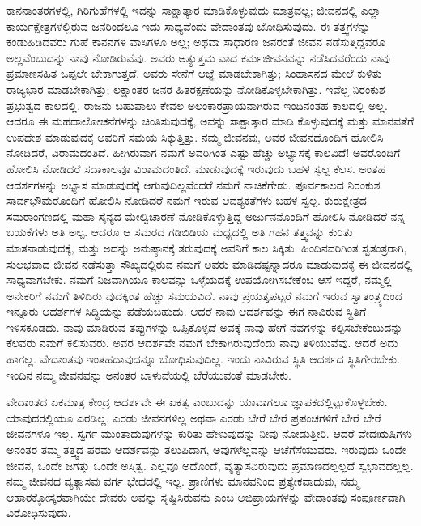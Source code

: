 ಕಾನನಾಂತರಗಳಲ್ಲಿ, ಗಿರಿಗುಹೆಗಳಲ್ಲಿ ಇದನ್ನು ಸಾಕ್ಷಾತ್ಕಾರ ಮಾಡಿಕೊಳ್ಳುವುದು ಮಾತ್ರವಲ್ಲ; ಜೀವನದಲ್ಲಿ ಎಲ್ಲಾ ಕಾರ್ಯಕ್ಷೇತ್ರಗಳಲ್ಲಿರುವ ಜನರಿಂದಲೂ ಇದು ಸಾಧ್ಯವೆಂದು ವೇದಾಂತವು ಬೋಧಿಸುವುದು. ಈ ತತ್ತ್ವಗಳನ್ನು ಕಂಡುಹಿಡಿದವರು ಗುಹೆ ಕಾನನಗಳ ವಾಸಿಗಳೂ ಅಲ್ಲ; ಅಥವಾ ಸಾಧಾರಣ ಜನರಂತೆ ಜೀವನ ನಡೆಸುತ್ತಿದ್ದವರೂ ಅಲ್ಲವೆಂಬುದನ್ನು ನಾವು ನೋಡಿರುವೆವು. ಅವರು ಅತ್ಯುತ್ತಮ ವಾದ ಕರ್ಮಜೀವನವನ್ನು ನಡೆಸಿದವರೆಂದು ನಾವು ಪ್ರಮಾಣಸಹಿತ ಒಪ್ಪಲೇ ಬೇಕಾಗುತ್ತದೆ. ಅವರು ಸೇನೆಗೆ ಆಜ್ಞೆ ಮಾಡಬೇಕಾಗಿತ್ತು; ಸಿಂಹಾಸನದ ಮೇಲೆ ಕುಳಿತು ರಾಜ್ಯಭಾರ ಮಾಡಬೇಕಾಗಿತ್ತು; ಲಕ್ಷಾಂತರ ಜನರ ಹಿತರಕ್ಷಣೆಯನ್ನು ನೋಡಿಕೊಳ್ಳಬೇಕಾಗಿತ್ತು. ಇವೆಲ್ಲ ನಿರಂಕುಶ ಪ್ರಭುತ್ವದ ಕಾಲದಲ್ಲಿ, ರಾಜನು ಬಹುಪಾಲು ಕೇವಲ ಅಲಂಕಾರಪ್ರಾಯನಾಗಿರುವ ಇಂದಿನಂತಹ ಕಾಲದಲ್ಲಿ ಅಲ್ಲ. ಆದರೂ ಈ ಮಹದಾಲೋಚನೆಗಳನ್ನು ಚಿಂತಿಸುವುದಕ್ಕೆ, ಅವನ್ನು ಸಾಕ್ಷಾತ್ಕಾರ ಮಾಡಿ ಕೊಳ್ಳುವುದಕ್ಕೆ ಮತ್ತು ಮಾನವತೆಗೆ ಉಪದೇಶ ಮಾಡುವುದಕ್ಕೆ ಅವರಿಗೆ ಸಮಯ ಸಿಕ್ಕುತ್ತಿತ್ತು. ನಮ್ಮ ಜೀವನವು, ಅವರ ಜೀವನದೊಂದಿಗೆ ಹೋಲಿಸಿ ನೋಡಿದರೆ, ವಿರಾಮದಂತಿದೆ. ಹೀಗಿರುವಾಗ ನಮಗೆ ಅವರಿಗಿಂತ ಎಷ್ಟು ಹೆಚ್ಚು ಅಭ್ಯಾಸಕ್ಕೆ ಕಾಲವಿದೆ! ಅವರೊಂದಿಗೆ ಹೋಲಿಸಿ ನೋಡಿದರೆ ಸದಾಕಾಲವೂ ವಿರಾಮದಂತಿದೆ. ಮಾಡುವುದಕ್ಕೆ ಇರುವುದು ಬಹಳ ಸ್ವಲ್ಪ ಕೆಲಸ. ಅಂತಹ ಆದರ್ಶಗಳನ್ನು ಅಭ್ಯಾಸ ಮಾಡುವುದಕ್ಕೆ ಆಗುವುದಿಲ್ಲವೆಂದರೆ ನಮಗೆ ನಾಚಿಕೆಗೇಡು. ಪೂರ್ವಕಾಲದ ನಿರಂಕುಶ ಸಾರ್ವಭೌಮರೊಂದಿಗೆ ಹೋಲಿಸಿ ನೋಡಿದರೆ ನಮಗೆ ಇರುವ ಆವಶ್ಯಕತೆಗಳು ಬಹಳ ಸ್ವಲ್ಪ. ಕುರುಕ್ಷೇತ್ರದ ಸಮರಾಂಗಣದಲ್ಲಿ ಮಹಾ ಸೈನ್ಯದ ಮೇಲ್ವಿಚಾರಣೆ ನೋಡಿಕೊಳ್ಳುತ್ತಿದ್ದ ಅರ್ಜುನನೊಂದಿಗೆ ಹೋಲಿಸಿ ನೋಡಿದರೆ ನನ್ನ ಬಯಕೆಗಳು ಅತಿ ಅಲ್ಪ. ಆದರೂ ಆ ಸಮರದ ಗಡಿಬಿಡಿಯ ಮಧ್ಯದಲ್ಲಿ ಅತಿ ಗಹನ ತತ್ತ್ವವನ್ನು ಕುರಿತು ಮಾತನಾಡುವುದಕ್ಕೆ, ಮತ್ತು ಅದನ್ನು ಅನುಷ್ಠಾನಕ್ಕೆ ತರುವುದಕ್ಕೆ ಅವನಿಗೆ ಕಾಲ ಸಿಕ್ಕಿತು. ಹಿಂದಿನವರಿಗಿಂತ ಸ್ವತಂತ್ರರಾಗಿ, ಸುಲಭವಾದ ಜೀವನ ನಡೆಸುತ್ತಾ ಸೌಖ್ಯದಲ್ಲಿರುವ ನಮಗೆ ಅವರು ಮಾಡಿದಷ್ಟನ್ನಾದರೂ ಮಾಡುವುದಕ್ಕೆ ಈ ಜೀವನದಲ್ಲಿ ಸಾಧ್ಯವಾಗಬೇಕು. ನಮಗೆ ನಿಜವಾಗಿಯೂ ಕಾಲವನ್ನು ಒಳ್ಳೆಯದಕ್ಕೆ ಉಪಯೋಗಿಸಬೇಕೆಂಬ ಆಸೆ ಇದ್ದರೆ, ನಮ್ಮಲ್ಲಿ ಅನೇಕರಿಗೆ ನಮಗೆ ತಿಳಿದಿರು ವುದಕ್ಕಿಂತ ಹೆಚ್ಚು ಸಮಯವಿದೆ. ನಾವು ಪ್ರಯತ್ನಪಟ್ಟರೆ ನಮಗೆ ಇರುವ ಸ್ವಾತಂತ್ರ್ಯದಿಂದ ಇನ್ನೂರು ಆದರ್ಶಗಳ ಸಿದ್ಧಿಯನ್ನು ಪಡೆಯಬಹುದು. ಆದರೆ ನಾವು ಆದರ್ಶವನ್ನು ಈಗ ನಾವಿರುವ ಸ್ಥಿತಿಗೆ ಇಳಿಸಕೂಡದು. ನಾವು ಮಾಡಿರುವ ತಪ್ಪುಗಳನ್ನು ಒಪ್ಪಿಕೊಳ್ಳದೆ ಅವಕ್ಕೆ ನಾವು ಹೇಗೆ ನೆವಗಳನ್ನು ಕಲ್ಪಿಸಬೇಕೆಂಬುದನ್ನು ಕೆಲವರು ನಮಗೆ ಕಲಿಸುವರು. ಅವರ ಆದರ್ಶವೇ ನಮಗೆ ಬೇಕಾಗಿರುವುದೆಂದು ನಾವು ತಿಳಿಯುವೆವು. ಆದರೆ ಅದು ಹಾಗಲ್ಲ. ವೇದಾಂತವು ಇಂತಹದಾವುದನ್ನೂ ಬೋಧಿಸುವುದಿಲ್ಲ. ಇಂದು ನಾವಿರುವ ಸ್ಥಿತಿ ಆದರ್ಶದ ಸ್ಥಿತಿಗೇರಬೇಕು. ಇಂದಿನ ನಮ್ಮ ಜೀವನವನ್ನು ಅನಂತರ ಬಾಳುವೆಯಲ್ಲಿ ಬೆರೆಯುವಂತೆ ಮಾಡಬೇಕು.

ವೇದಾಂತದ ಏಕಮಾತ್ರ ಕೇಂದ್ರ ಆದರ್ಶವೇ ಈ ಏಕತ್ವ ಎಂಬುದನ್ನು ಯಾವಾಗಲೂ ಜ್ಞಾಪಕದಲ್ಲಿಟ್ಟುಕೊಳ್ಳಬೇಕು. ಯಾವುದರಲ್ಲಿಯೂ ಎರಡಿಲ್ಲ. ಎರಡು ಜೀವನಗಳಿಲ್ಲ ಅಥವಾ ಎರಡು ಬೇರೆ ಬೇರೆ ಪ್ರಪಂಚಗಳಿಗೆ ಬೇರೆ ಬೇರೆ ಜೀವನಗಳೂ ಇಲ್ಲ. ಸ್ವರ್ಗ ಮುಂತಾದುವುಗಳನ್ನು ಕುರಿತು ಹೇಳುವುದನ್ನು ನೀವು ನೋಡುತ್ತೀರಿ. ಆದರೆ ವೇದಋಷಿಗಳು ಅನಂತರ ತಮ್ಮ ತತ್ತ್ವದ ಪರಮ ಆದರ್ಶವನ್ನು ತಲುಪಿದಾಗ, ಅವುಗಳೆಲ್ಲವನ್ನು ಆಚೆಗೆಸೆಯುವರು. ಇರುವುದು ಒಂದೇ ಜೀವನ, ಒಂದೇ ಜಗತ್ತು ಒಂದೇ ಅಸ್ತಿತ್ವ. ಎಲ್ಲವೂ ಅದೊಂದೆ, ವ್ಯತ್ಯಾಸವಿರುವುದು ಪ್ರಮಾಣದಲ್ಲಲ್ಲದೆ ಸ್ವಭಾವದಲ್ಲಲ್ಲ. ನಮ್ಮ ಜೀವನದ ವ್ಯತ್ಯಾಸವು ವರ್ಗ ಭೇದದಲ್ಲಿ ಇಲ್ಲ. ಪ್ರಾಣಿಗಳು ಮಾನವನಿಂದ ಪ್ರತ್ಯೇಕವಾದುವು, ನಮ್ಮ ಆಹಾರಕ್ಕೋಸ್ಕರವಾಗಿಯೇ ದೇವರು ಅವನ್ನು ಸೃಷ್ಟಿಸಿರುವನು ಎಂಬ ಅಭಿಪ್ರಾಯಗಳನ್ನು ವೇದಾಂತವು ಸಂಪೂರ್ಣವಾಗಿ ವಿರೋಧಿಸುವುದು.

